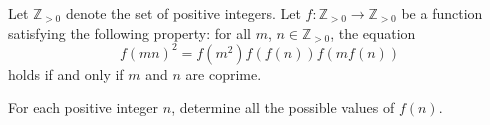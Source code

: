 Let $\mathbb{Z}_{>0}$ denote the set of positive integers. Let $f \colon \mathbb{Z}_{>0} \to \mathbb{Z}_{>0}$ be a function satisfying the following property: for all $m$, $n \in \mathbb{Z}_{>0}$, the equation
\[
f(mn)^2 = f(m^2)f(f(n))f(mf(n))
\]
holds if and only if $m$ and $n$ are coprime.

For each positive integer $n$, determine all the possible values of $f(n)$.
